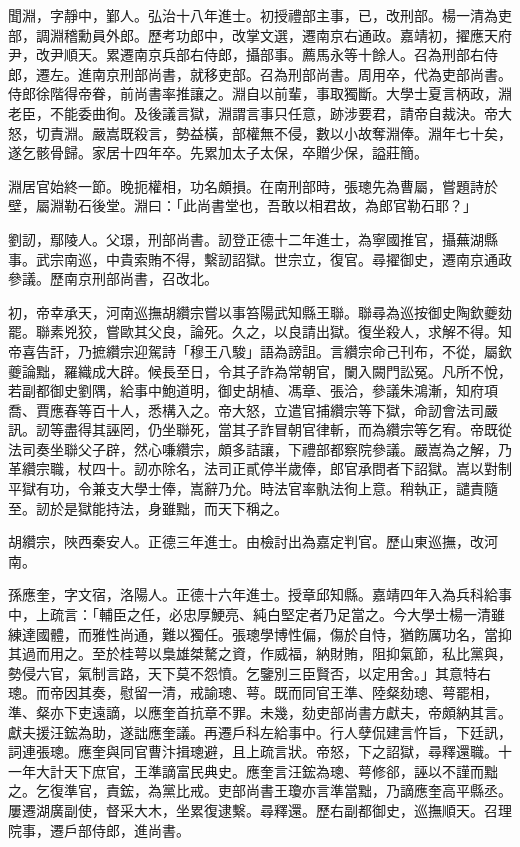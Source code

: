 \begin{pinyinscope}
聞淵，字靜中，鄞人。弘治十八年進士。初授禮部主事，已，改刑部。楊一清為吏部，調淵稽勳員外郎。歷考功郎中，改掌文選，遷南京右通政。嘉靖初，擢應天府尹，改尹順天。累遷南京兵部右侍郎，攝部事。薦馬永等十餘人。召為刑部右侍郎，遷左。進南京刑部尚書，就移吏部。召為刑部尚書。周用卒，代為吏部尚書。侍郎徐階得帝眷，前尚書率推讓之。淵自以前輩，事取獨斷。大學士夏言柄政，淵老臣，不能委曲徇。及後議言獄，淵謂言事只任意，跡涉要君，請帝自裁決。帝大怒，切責淵。嚴嵩既殺言，勢益橫，部權無不侵，數以小故奪淵俸。淵年七十矣，遂乞骸骨歸。家居十四年卒。先累加太子太保，卒贈少保，謚莊簡。

淵居官始終一節。晚扼權相，功名頗損。在南刑部時，張璁先為曹屬，嘗題詩於壁，屬淵勒石後堂。淵曰：「此尚書堂也，吾敢以相君故，為郎官勒石耶？」

劉訒，鄢陵人。父璟，刑部尚書。訒登正德十二年進士，為寧國推官，攝蕪湖縣事。武宗南巡，中貴索賄不得，繫訒詔獄。世宗立，復官。尋擢御史，遷南京通政參議。歷南京刑部尚書，召改北。

初，帝幸承天，河南巡撫胡纘宗嘗以事笞陽武知縣王聯。聯尋為巡按御史陶欽夔劾罷。聯素兇狡，嘗歐其父良，論死。久之，以良請出獄。復坐殺人，求解不得。知帝喜告訐，乃摭纘宗迎駕詩「穆王八駿」語為謗詛。言纘宗命己刊布，不從，屬欽夔論黜，羅織成大辟。候長至日，令其子詐為常朝官，闌入闕門訟冤。凡所不悅，若副都御史劉隅，給事中鮑道明，御史胡植、馮章、張洽，參議朱鴻漸，知府項喬、賈應春等百十人，悉構入之。帝大怒，立遣官捕纘宗等下獄，命訒會法司嚴訊。訒等盡得其誣罔，仍坐聯死，當其子詐冒朝官律斬，而為纘宗等乞宥。帝既從法司奏坐聯父子辟，然心嗛纘宗，頗多詰讓，下禮部都察院參議。嚴嵩為之解，乃革纘宗職，杖四十。訒亦除名，法司正貳停半歲俸，郎官承問者下詔獄。嵩以對制平獄有功，令兼支大學士俸，嵩辭乃允。時法官率骫法徇上意。稍執正，譴責隨至。訒於是獄能持法，身雖黜，而天下稱之。

胡纘宗，陜西秦安人。正德三年進士。由檢討出為嘉定判官。歷山東巡撫，改河南。

孫應奎，字文宿，洛陽人。正德十六年進士。授章邱知縣。嘉靖四年入為兵科給事中，上疏言：「輔臣之任，必忠厚鯁亮、純白堅定者乃足當之。今大學士楊一清雖練達國體，而雅性尚通，難以獨任。張璁學博性偏，傷於自恃，猶飭厲功名，當抑其過而用之。至於桂萼以梟雄桀驁之資，作威福，納財賄，阻抑氣節，私比黨與，勢侵六官，氣制言路，天下莫不怨憤。乞鑒別三臣賢否，以定用舍。」其意特右璁。而帝因其奏，慰留一清，戒諭璁、萼。既而同官王準、陸粲劾璁、萼罷相，準、粲亦下吏遠謫，以應奎首抗章不罪。未幾，劾吏部尚書方獻夫，帝頗納其言。獻夫援汪鋐為助，遂詘應奎議。再遷戶科左給事中。行人孽侃建言忤旨，下廷訊，詞連張璁。應奎與同官曹汴揖璁避，且上疏言狀。帝怒，下之詔獄，尋釋還職。十一年大計天下庶官，王準謫富民典史。應奎言汪鋐為璁、萼修郤，誣以不謹而黜之。乞復準官，責鋐，為黨比戒。吏部尚書王瓊亦言準當黜，乃謫應奎高平縣丞。屢遷湖廣副使，督采大木，坐累復逮繫。尋釋還。歷右副都御史，巡撫順天。召理院事，遷戶部侍郎，進尚書。


\end{pinyinscope}

